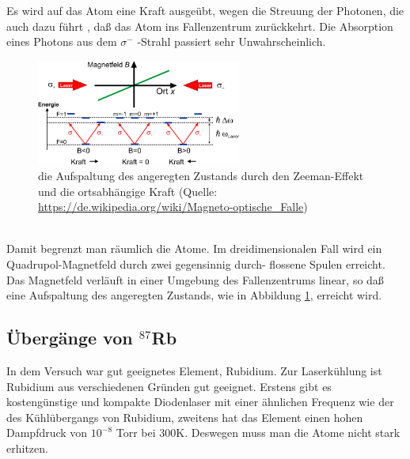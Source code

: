 \documentclass[12pt,a4paper]{article}
\begin{document}
  Es wird auf das Atom eine Kraft ausgeübt, wegen die Streuung der Photonen, die auch dazu führt , daß das Atom ins Fallenzentrum zurückkehrt. Die Absorption eines Photons aus dem ${\sigma^-}$ -Strahl passiert sehr Unwahrscheinlich.
  \begin{figure}[h!]
  \centering
  \includegraphics[width=0.6\textwidth]{Mot_posforce.png}
  \caption{die Aufspaltung des angeregten Zustands durch den Zeeman-Effekt und die ortsabhängige Kraft (Quelle: \url{https://de.wikipedia.org/wiki/Magneto-optische_Falle})}
  \label{zeemanmot}
  \end{figure}\\
 Damit begrenzt man räumlich die Atome. Im dreidimensionalen Fall wird ein Quadrupol-Magnetfeld durch zwei gegensinnig durch- flossene Spulen erreicht. Das Magnetfeld verläuft in einer Umgebung des Fallenzentrums linear, so daß eine Aufspaltung des angeregten Zustands, wie in Abbildung \ref{zeemanmot}, erreicht wird.
  \subsection{Übergänge von ${}^{87}$Rb}
  In dem Versuch war gut geeignetes Element, Rubidium. Zur Laserkühlung ist Rubidium aus verschiedenen Gründen gut geeignet. Erstens gibt es kostengünstige und kompakte Diodenlaser mit einer ähnlichen Frequenz wie der des Kühlübergangs von Rubidium, zweitens hat das Element einen hohen Dampfdruck von ${10^{-8}}$ Torr bei 300K. Deswegen muss man die Atome nicht stark erhitzen.
  
\end{document}
